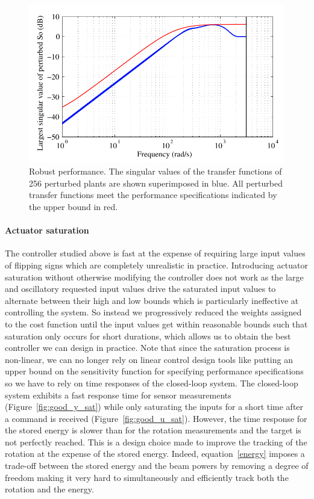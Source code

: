 \documentclass[12pt,lot, lof]{puthesis}
\begin{document}
\begin{figure}[htbp]
	\centering
	\includegraphics{chap10/robust_performance}
	\caption{Robust performance.
		The singular values of the transfer functions of 256 perturbed plants are shown superimposed in blue.
		All perturbed transfer functions meet the performance specifications indicated by the upper bound in red.}
	\label{fig:robust_performance}
\end{figure}


\paragraph{Actuator saturation}

The controller studied above is fast at the expense of requiring large input values of flipping signs which are completely unrealistic in practice.
Introducing actuator saturation without otherwise modifying the controller does not work as the large and oscillatory requested input values drive the saturated input values to alternate between their high and low bounds which is particularly ineffective at controlling the system.
So instead we progressively reduced the weights assigned to the cost function until the input values get within reasonable bounds such that saturation only occurs for short durations, which allows us to obtain the best controller we can design in practice.
Note that since the saturation process is non-linear, we can no longer rely on linear control design tools like putting an upper bound on the sensitivity function for specifying performance specifications so we have to rely on time responses of the closed-loop system.
The closed-loop system exhibits a fast response time for sensor measurements (Figure~\ref{fig:good_y_sat}) while only saturating the inputs for a short time after a command is received (Figure~\ref{fig:good_u_sat}).
However, the time response for the stored energy is slower than for the rotation measurements and the target is not perfectly reached.
This is a design choice made to improve the tracking of the rotation at the expense of the stored energy.
Indeed, equation~\eqref{energy} imposes a trade-off between the stored energy and the beam powers by removing a degree of freedom making it very hard to simultaneously and efficiently track both the rotation and the energy.
\end{document}
